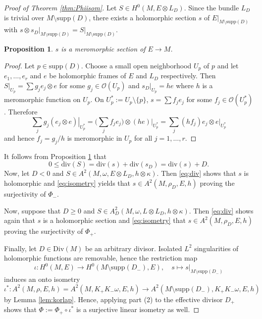 \documentclass[10pt,a4paper]{amsart}
\newtheorem{prop}{Proposition}
\begin{document}
\begin{proof}[Proof of Theorem \ref{thm:Phiisom}]
Let  $S\in H^0(M,E\otimes L_D)$. Since the bundle $L_D$ is trivial over $M\setminus{\text{supp}(D)}$, there exists a holomorphic section $s$ of $\left.E\right|_{M\setminus{\text{supp}(D)}}$ with
$s\otimes\left.s_D\right|_{M\setminus{\text{supp}(D)}}=\left.S\right|_{M\setminus{\text{supp}(D)}}$.
\begin{prop} \label{prop:smerom}
    $s$ is a meromorphic section of $E\rightarrow M$.
\end{prop}
\begin{proof}
 Let $p\in \text{supp}(D)$. Choose a small open neighborhood $U_p$ of $p$ and let $e_1,\dots,e_r$ and $e$ be holomorphic frames of $E$ and $L_D$ respectively. Then $\left.S\right|_{U_p}=\sum g_je_j\otimes e$ for some $g_j\in\mathcal O(U_p)$ and $\left.s_D\right|_{U_p}=he$ where $h$ is a meromorphic function on $U_p$. On $U^*_p:=U_p\setminus\{p\}$, $s=\sum f_je_j$ for some $f_j\in\mathcal O(U^*_p)$.
 Therefore
 $$
\sum_j g_j\left.(e_j\otimes e)\right|_{U^*_p}= \Big(\sum_j f_je_j\Big)\otimes\left.(he)\right|_{U^*_p}=
\sum_j (hf_j)e_j\otimes \left.e\right|_{U^*_p}
 $$
 and hence $f_j=g_j/h$ is meromorphic
 in $U_p$ for all $j=1,\dots, r$.
\end{proof}
\noindent It follows from Proposition \ref{prop:smerom} that
\begin{equation}\label{eq:div}
 0\le\text{div}(S)=\text{div}(s)+\text{div}(s_D)=\text{div}(s)+D.   
\end{equation}
Now, let $D<0$ and $S\in A^2(M,\omega, E\otimes L_D,h\otimes\kappa)$. Then 
\eqref{eq:div} shows that $s$ is holomorphic and \eqref{eq:isometry}  yields that $s\in A^2(M,\rho_D,E,h)$ 
 proving the surjectivity of $\Phi_-$.
 


Now, suppose that $D\geq0$ and 
$S\in A^2_D(M,\omega,L\otimes L_D, h\otimes\kappa)$.
Then \eqref{eq:div} shows again that $s$ is a holomorphic section and \eqref{eq:isometry} that
 $s\in A^2(M,\rho_D,E,h)$ 
 proving the surjectivity of $\Phi_+$.

 Finally, let $D \in \text{Div}(M)$ be an arbitrary divisor.  Isolated $L^2$ singularities of holomorphic functions are removable, hence the restriction map
 $$
 \iota: H^0(M,E)\rightarrow H^0(M\setminus\text{supp} (D_-),E),\quad s\mapsto 
 \left.s\right|_{M\setminus\text{supp}(D_-)}
 $$
 induces an onto isometry
 $$
\iota^*:A^2(M,\rho,E,h)=A^2(M,K_+K_-\omega,E,h)\rightarrow A^2(M\setminus\text{supp}(D_-), K_+K_-\omega, E,h)$$
by Lemma \ref{lem:korlap}. Hence, applying part (2) to the effective divisor $D_+$ shows that $\Phi := \Phi_+ \circ \iota^*$ is a surjective linear isometry as well.
\end{proof}
\end{document}
